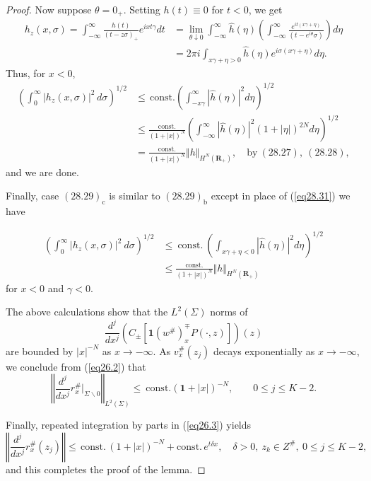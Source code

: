 \documentclass{surv-l}
\theoremstyle{plain}
\theoremstyle{definition}
\numberwithin{equation}{chapter}
\begin{document}
\begin{proof}
Now suppose $\theta=0_{+}$. Setting $h(t)\equiv 0$ for $t<0$, we get
\begin{align*}
h_{z}(x, \sigma)=\int_{-\infty}^{\infty}\frac{h(t)}{(t-z\sigma)_{+}}e^{ixt\gamma}dt&=\lim_{\theta\downarrow 0}\int_{-\infty}^{\infty}\hat{h}(\eta)\left(\int_{-\infty}^{\infty}\frac{e^{it(x\gamma+\eta)}}{(t-e^{i\theta}\sigma)}\right)d\eta\\
&=2\pi i\int_{x\gamma+\eta>0}\hat{h}(\eta)e^{i\sigma(x\gamma+\eta)}d\eta.
\end{align*}
Thus, for $x<0$,
\begin{align}\label{eq28.31}
\left(\int_{0}^{\infty}|h_{z}(x,\sigma)|^{2}\,d\sigma\right)^{1/2}&\leq\,\mathrm{const.}\left( \int_{-x\gamma}^{\infty}|\hat{h}(\eta)|^{2}d\eta\right)^{1/2}\\\nonumber
&\leq\frac{\mathrm{const.}}{(1+|x|)^{N}}\left(\int_{-\infty}^{\infty}|\hat{h}(\eta)|^{2}(1+|\eta|)^{2N}d\eta\right)^{1/2}\\ \nonumber
&=\frac{\mathrm{const.}}{(1+|x|)^{N}}\Vert h\Vert_{H^{N}(\mathbf{R}_{+})},\quad \mathrm{by}\ (28.27),\ (28.28),\nonumber
\end{align}
and we are done.

Finally, case $(28.29)_{\mathrm{c}}$ is similar to $(28.29)_{\mathrm{b}}$ except in place of (\ref{eq28.31}) we have

\begin{align*}
\tag*{(28.31)$'$}\left( \int_{0}^{\infty}|h_{z}(x,\sigma)|^{2}\ d\sigma\right)^{1/2}&\leq\ \mathrm{const}.\ \left( \int_{x\gamma+\eta<0}|\hat{h}(\eta)|^{2}d\eta\right)^{1/2}\\
&\leq\frac{\mathrm{const.}}{(1+|x|)^{N}}\Vert h\Vert_{H^{N}(\mathbf{R}_{+})}\nonumber
\end{align*}
for $x<0$ and $\gamma<0$.

The above calculations show that the $L^{2}(\Sigma)$ norms of
\begin{equation*}
\frac{d^{j}}{dx^{j}}(C_{\pm}[\mathbf{1}(w^{\#})_{x}^{\mp}P(\cdot, z)])(z)
\end{equation*}
are bounded by $|x|^{-N}$ as $ x\rightarrow-\infty$. As $v_{x}^{\#}(z_{j})$ decays exponentially as $ x\rightarrow-\infty$, we conclude from (\ref{eq26.2}) that
\begin{equation*}
\left\Vert\frac{d^{j}}{dx^{j}}r_{x}^{\#}\Big|_{\Sigma\backslash 0}\right\Vert_{L^{2}(\Sigma)}\leq\ \mathrm{const.} (\mathbf{1}+|x|)^{-N},\qquad 0\leq j\leq K-2.
\end{equation*}

Finally, repeated integration by parts in (\ref{eq26.3}) yields
\begin{equation*}
\left\Vert\frac{d^{j}}{dx^{j}}r_{x}^{\#}(z_{j})\right\Vert\leq\, \mathrm{const.}\, (1+|x|)^{-N}+\mathrm{const.}\, e^{t\delta x},\quad \delta>0,\ z_{k}\in Z^{\#},\ 0\leq j\leq K-2,
\end{equation*}
and this completes the proof  of the lemma.
\end{proof}
\end{document}
